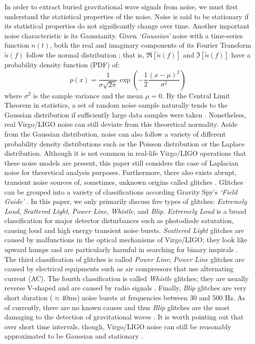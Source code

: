 \documentclass[preprint,
letterpaper,
 amsmath,amssymb,
 aps,
]{revtex4-2}
\begin{document}
In order to extract buried gravitational wave signals from noise, we must first understand the statistical properties of the noise. Noise is said to be stationary if its statistical properties do not significantly change over time. Another important noise characteristic is its Gaussianity. Given \textit{`Gaussian'} noise with a time-series function $n(t)$, both the real and imaginary components of its Fourier Transform $\widetilde{n}(f)$ follow the normal distribution \cite{yamamoto}; that is, $\Re[\widetilde{n}(f)]$ and  $\Im{[\widetilde{n}(f)]}$ have a probability density function (PDF) of:
\begin{equation}
    p(x) = \frac{1}{\sigma\sqrt{2\pi}}\exp{\left(-\frac{1}{2}\frac{(x-\mu)^2}{\sigma^2}\right)}
\end{equation}
where $\sigma^2$ is the sample variance and the mean $\mu = 0$. By the Central Limit Theorem in statistics, a set of random noise sample naturally tends to the Gaussian distribution if sufficiently large data samples were taken \cite{jaranowski2007gravitationalwave}. Nonetheless, real Virgo/LIGO noise can still deviate from this theoretical normality. Aside from the Gaussian distribution, noise can also follow a variety of different probability density distributions such as the Poisson distribution or the Laplace distribution. Although it is not common in real-life Virgo/LIGO operations that these noise models are present, this paper still considers the case of Laplacian noise for theoretical analysis purposes. Furthermore, there also exists abrupt, transient noise sources of, sometimes, unknown origins called glitches \cite{ultimate}. Glitches can be grouped into a variety of classifications according Gravity Spy's \textit{`Field Guide'} \cite{gravityspy}. In this paper, we only primarily discuss five types of glitches: \textit{Extremely Loud}, \textit{Scattered Light}, \textit{Power Line}, \textit{Whistle}, and \textit{Blip}. \textit{Extremely Loud} is a broad classification for major detector disturbances such as photodiode saturation, causing loud and high energy transient noise bursts. \textit{Scattered Light} glitches are caused by malfunctions in the optical mechanisms of Virgo/LIGO; they look like upward humps and are particularly harmful in searching for binary inspirals \cite{gravityspy}. The third classification of glitches is called \textit{Power Line}; \textit{Power Line} glitches are caused by electrical equipments such as air compressors that use alternating current (AC). The fourth classification is called \textit{Whistle} glitches; they are usually reverse V-shaped and are caused by radio signals \cite{gravityspy}. Finally, \textit{Blip} glitches are very short duration ($\approx 40$ms) noise bursts at frequencies between 30 and 500 Hz. As of currently, there are no known causes and thus \textit{Blip} glitches are the most damaging to the detection of gravitational waves \cite{gravityspy}. It is worth pointing out that over short time intervals, though, Virgo/LIGO noise can still be reasonably approximated to be Gaussian and stationary \cite{collaboration2019open}.
\end{document}
